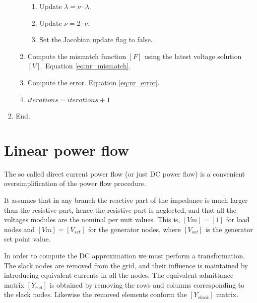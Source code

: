 \documentclass[nols,a4paper,twoside,notoc,fleqn]{tufte-book}
\begin{document}
\begin{enumerate}
\begin{enumerate}
\begin{enumerate}
		\item Update $\lambda = \nu \cdot \lambda$.
		
		\item Update $\nu = 2 \cdot \nu$.
		
		\item Set the Jacobian update flag to false.
		\end{enumerate}
	
	\item Compute the mismatch function $[F]$ using the latest voltage solution $[V]$. Equation \ref{eq:nr_mismatch}.
	
	\item Compute the error. Equation \ref{eq:nr_error}.
	
	\item $iterations = iterations + 1$
	\end{enumerate}

\item End.
\end{enumerate}

\section{Linear power flow}\label{DCPF}
The so called direct current power flow (or just DC power flow) is a convenient oversimplification of the power flow procedure.

It assumes that in any branch the reactive part of the impedance is much larger than the resistive part, hence the resistive part is neglected, and that all the voltages modules are the nominal per unit values. This is, $[Vm]=[1]$ for load nodes and $[Vm]=[V_{set}]$ for the generator nodes, where $[V_{set}]$ is the generator set point value.

In order to compute the DC approximation we must perform a transformation. The slack nodes are removed from the grid, and their influence is maintained by introducing equivalent currents in all the nodes. The equivalent admittance matrix $[{Y}_{red}]$ is obtained by removing the rows and columns corresponding to the slack nodes. Likewise the removed elements conform the $[{Y}_{slack}]$ matrix.
\end{document}
